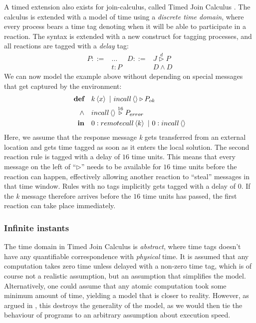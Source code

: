 A timed extension also exists for join-calculus, called Timed Join
Calculus \cite{timed-join}. The calculus is extended with a model of
time using a \emph{discrete time domain}, where every process bears a
time tag denoting when it will be able to participate in a reaction.
The syntax is extended with a new construct for tagging processes,
and all reactions are tagged with a
\emph{delay} tag:
\begin{align*}
  P ::={} & ...    & D ::={}& J \stackrel{d}{\triangleright} P \\
          & t : P  &        & D \land D
\end{align*}
We can now model the example above without depending on special
messages that get captured by the environment:
\begin{align*}
  \textbf{def}\quad & \atm k<x> ~|~ \atm incall<> \triangleright P_{ok} \\
  \land\quad & \atm incall<> \stackrel{16}{\triangleright} P_{error} \\
  \textbf{in}\quad & \atm 0:remotecall<k> ~|~ \atm 0:incall<>
\end{align*}
Here, we assume that the response message \emph{k} gets transferred
from an external location and gets time tagged as soon as it enters
the local solution.  The second reaction rule is tagged with a delay
of $16$ time units.  This means that every message on the left of
``$\triangleright$'' needs to be available for $16$ time units before
the reaction can happen, effectively allowing another reaction to
``steal'' messages in that time window. Rules with no tags implicitly
gets tagged with a delay of $0$. If the \emph{k} message therefore
arrives before the $16$ time units has passed, the first reaction can
take place immediately.


\subsubsection{Infinite instants}

The time domain in Timed Join Calculus is \emph{abstract}, where time
tags doesn't have any quantifiable correspondence with \emph{physical}
time. It is assumed that any computation takes zero time unless
delayed with a non-zero time tag, which is of course not a realistic
assumption, but an assumption that simplifies the model.
Alternatively, one could assume that any atomic computation took some
minimum amount of time, yielding a model that is closer to reality.
However, as argued in \cite{nicollin-overview}, this destroys the
generality of the model, as we would then tie the behaviour of programs
to an arbitrary assumption about execution speed.

